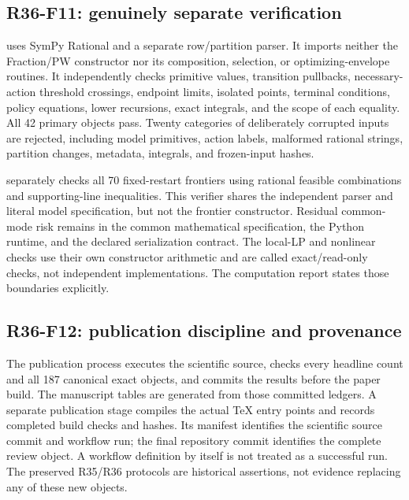 \subsection{R36-F11: genuinely separate verification}
 uses SymPy Rational and a separate row/partition parser. It imports neither the Fraction/PW constructor nor its composition, selection, or optimizing-envelope routines. It independently checks primitive values, transition pullbacks, necessary-action threshold crossings, endpoint limits, isolated points, terminal conditions, policy equations, lower recursions, exact integrals, and the scope of each equality. All 42 primary objects pass. Twenty categories of deliberately corrupted inputs are rejected, including model primitives, action labels, malformed rational strings, partition changes, metadata, integrals, and frozen-input hashes.

 separately checks all 70 fixed-restart frontiers using rational feasible combinations and supporting-line inequalities. This verifier shares the independent parser and literal model specification, but not the frontier constructor. Residual common-mode risk remains in the common mathematical specification, the Python runtime, and the declared serialization contract. The local-LP and nonlinear checks use their own constructor arithmetic and are called exact/read-only checks, not independent implementations. The computation report states those boundaries explicitly.

\subsection{R36-F12: publication discipline and provenance}
The publication process executes the scientific source, checks every headline count and all 187 canonical exact objects, and commits the results before the paper build. The manuscript tables are generated from those committed ledgers. A separate publication stage compiles the actual TeX entry points and records completed build checks and hashes. Its manifest identifies the scientific source commit and workflow run; the final repository commit identifies the complete review object. A workflow definition by itself is not treated as a successful run. The preserved R35/R36 protocols are historical assertions, not evidence replacing any of these new objects.

